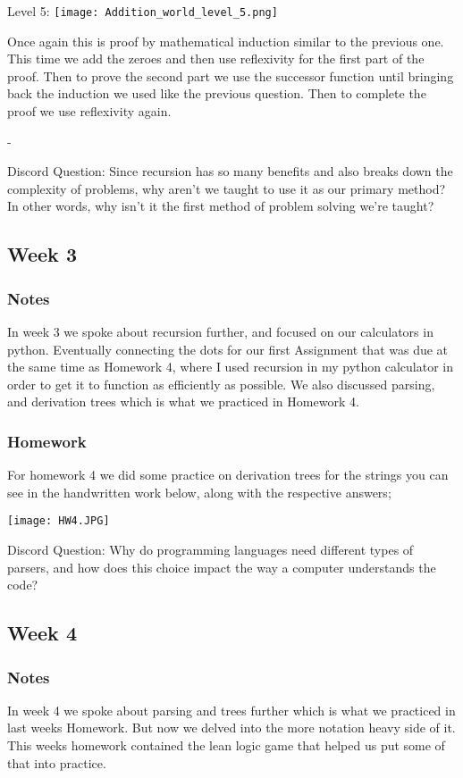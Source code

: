 \documentclass{article}
\theoremstyle{theorem}
\theoremstyle{definition}
\theoremstyle{remark}
\begin{document}
Level 5:
\texttt{[image: Addition\_world\_level\_5.png]}

Once again this is proof by mathematical induction similar to the previous one. This time we add the zeroes and then use reflexivity for the first part of the proof. Then to prove the second part we use the successor function until bringing back the induction we used like the previous question. Then to complete the proof we use reflexivity again. 

-

Discord Question: Since recursion has so many benefits and also breaks down the complexity of problems, why aren't we taught to use it as our primary method? In other words, why isn't it the first method of problem solving we're taught?

\subsection{Week 3}
\subsubsection*{Notes}
In week 3 we spoke about recursion further, and focused on our calculators in python. Eventually connecting the dots for our first Assignment that was due at the same time as Homework 4, where I used recursion in my python calculator in order to get it to function as efficiently as possible. We also discussed parsing, and derivation trees which is what we practiced in Homework 4.

\subsubsection*{Homework}
For homework 4 we did some practice on derivation trees for the strings you can see in the handwritten work below, along with the respective answers;

\texttt{[image: HW4.JPG]}

Discord Question: Why do programming languages need different types of parsers, and how does this choice impact the way a computer understands the code?

\subsection{Week 4}
\subsubsection*{Notes}
In week 4 we spoke about parsing and trees further which is what we practiced in last weeks Homework. But now we delved into the more notation heavy side of it. This weeks homework contained the lean logic game that helped us put some of that into practice.
\end{document}
